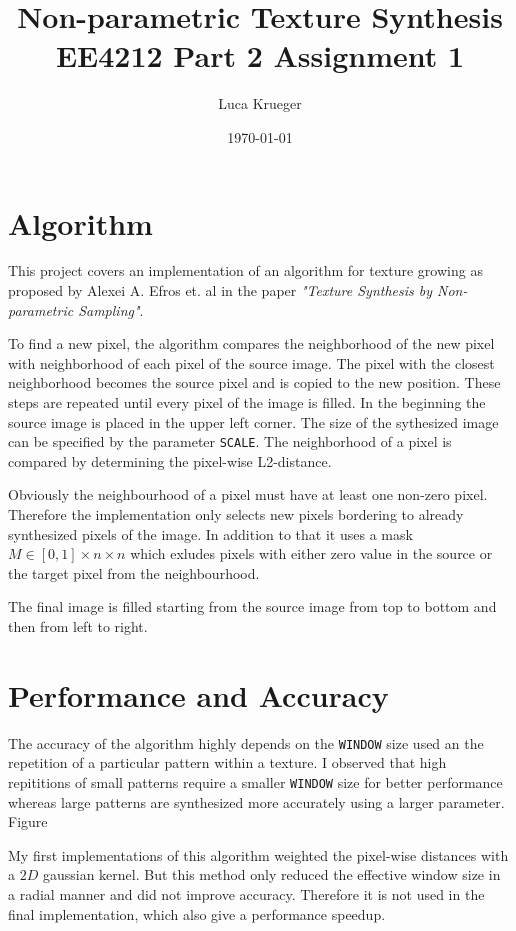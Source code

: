 \documentclass{article}
\title{Non-parametric Texture Synthesis \\ EE4212 Part 2 Assignment 1}
\author{Luca Krueger}
\date{\today}
\begin{document}
\maketitle

\section{Algorithm}
This project covers an implementation of an algorithm for texture growing as proposed by Alexei A. Efros et. al in the paper \textit{"Texture Synthesis by Non-parametric Sampling"}\cite{Efros}.

To find a new pixel, the algorithm compares the neighborhood of the new pixel with neighborhood of each pixel of the source image. The pixel with the closest neighborhood becomes the source pixel and is copied to the new position. These steps are repeated until every pixel of the image is filled.
In the beginning the source image is placed in the upper left corner. The size of the sythesized image can be specified by the parameter \texttt{SCALE}.
The neighborhood of a pixel is compared by determining the pixel-wise L2-distance. 

Obviously the neighbourhood of a pixel must have at least one non-zero pixel. Therefore the implementation only selects new pixels bordering to already synthesized pixels of the image. In addition to that it uses a mask $M\in [0,1]\times n \times n$ which exludes pixels with either zero value in the source or the target pixel from the neighbourhood.

The final image is filled starting from the source image from top to bottom and then from left to right.

\section{Performance and Accuracy}
The accuracy of the algorithm highly depends on the \texttt{WINDOW} size used an the repetition of a particular pattern within a texture. 
I observed that high repititions of small patterns require a smaller \texttt{WINDOW} size for better performance whereas large patterns are synthesized more accurately using a larger parameter. Figure 


My first implementations of this algorithm weighted the pixel-wise distances with a $2D$ gaussian kernel. But this method only reduced the effective window size in a radial manner and did not improve accuracy. Therefore it is not used in the final implementation, which also give a performance speedup.
\end{document}
